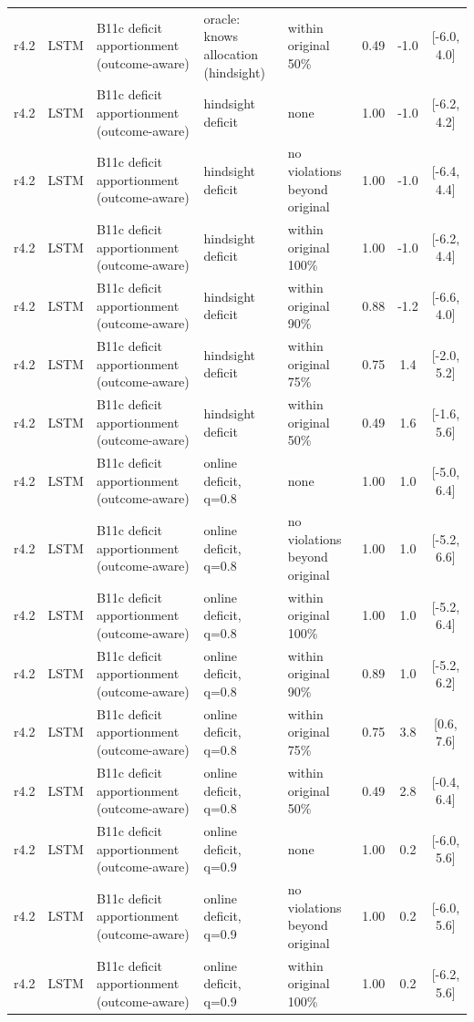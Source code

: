 \begin{longtable}{lllp{4.2cm}p{3.4cm}ccc}
r4.2 & LSTM & B11c deficit apportionment (outcome-aware) & oracle: knows allocation (hindsight) & within original 50\% & 0.49 & -1.0 & [-6.0, 4.0] \\
r4.2 & LSTM & B11c deficit apportionment (outcome-aware) & hindsight deficit & none & 1.00 & -1.0 & [-6.2, 4.2] \\
r4.2 & LSTM & B11c deficit apportionment (outcome-aware) & hindsight deficit & no violations beyond original & 1.00 & -1.0 & [-6.4, 4.4] \\
r4.2 & LSTM & B11c deficit apportionment (outcome-aware) & hindsight deficit & within original 100\% & 1.00 & -1.0 & [-6.2, 4.4] \\
r4.2 & LSTM & B11c deficit apportionment (outcome-aware) & hindsight deficit & within original 90\% & 0.88 & -1.2 & [-6.6, 4.0] \\
r4.2 & LSTM & B11c deficit apportionment (outcome-aware) & hindsight deficit & within original 75\% & 0.75 & 1.4 & [-2.0, 5.2] \\
r4.2 & LSTM & B11c deficit apportionment (outcome-aware) & hindsight deficit & within original 50\% & 0.49 & 1.6 & [-1.6, 5.6] \\
r4.2 & LSTM & B11c deficit apportionment (outcome-aware) & online deficit, q=0.8 & none & 1.00 & 1.0 & [-5.0, 6.4] \\
r4.2 & LSTM & B11c deficit apportionment (outcome-aware) & online deficit, q=0.8 & no violations beyond original & 1.00 & 1.0 & [-5.2, 6.6] \\
r4.2 & LSTM & B11c deficit apportionment (outcome-aware) & online deficit, q=0.8 & within original 100\% & 1.00 & 1.0 & [-5.2, 6.4] \\
r4.2 & LSTM & B11c deficit apportionment (outcome-aware) & online deficit, q=0.8 & within original 90\% & 0.89 & 1.0 & [-5.2, 6.2] \\
r4.2 & LSTM & B11c deficit apportionment (outcome-aware) & online deficit, q=0.8 & within original 75\% & 0.75 & 3.8 & [0.6, 7.6] \\
r4.2 & LSTM & B11c deficit apportionment (outcome-aware) & online deficit, q=0.8 & within original 50\% & 0.49 & 2.8 & [-0.4, 6.4] \\
r4.2 & LSTM & B11c deficit apportionment (outcome-aware) & online deficit, q=0.9 & none & 1.00 & 0.2 & [-6.0, 5.6] \\
r4.2 & LSTM & B11c deficit apportionment (outcome-aware) & online deficit, q=0.9 & no violations beyond original & 1.00 & 0.2 & [-6.0, 5.6] \\
r4.2 & LSTM & B11c deficit apportionment (outcome-aware) & online deficit, q=0.9 & within original 100\% & 1.00 & 0.2 & [-6.2, 5.6] \\

\end{longtable}
